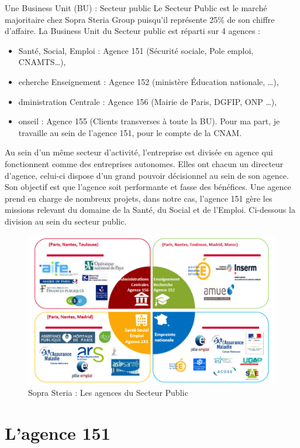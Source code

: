 Une Business Unit (BU) : Secteur public 
Le Secteur Public est le marché majoritaire chez Sopra Steria Group puisqu’il représente 25\% de son chiffre d’affaire.  La Business Unit du Secteur public est réparti sur 4 agences :  

\begin{itemize}
    \item Santé, Social, Emploi : Agence 151 (Sécurité sociale, Pole emploi, CNAMTS…), 
    \item echerche Enseignement : Agence 152 (ministère Éducation nationale, …), 
    \item dministration Centrale : Agence 156 (Mairie de Paris, DGFIP, ONP …), 
    \item onseil : Agence 155 (Clients transverses à toute la BU). Pour ma part, je travaille au sein de l’agence 151, pour le compte de la CNAM.
\end{itemize}


Au sein d'un même secteur d'activité, l'entreprise est divisée en agence qui fonctionnent comme des entreprises autonomes. Elles ont chacun un directeur d'agence, celui-ci dispose d'un grand pouvoir décisionnel au sein de son agence. Son objectif est que l'agence soit performante et fasse des bénéfices.
Une agence prend en charge de nombreux projets, dans notre cas, l'agence 151 gère les missions relevant du domaine de la Santé, du Social et de l’Emploi.
Ci-dessous la division au sein du secteur public.

\begin{figure}[!h]
\centering
\includegraphics[width=1\textwidth]{images/divisionSecteurPublic.png}
\caption{Sopra Steria : Les agences du Secteur Public}
\end{figure}

\section{L'agence 151}

